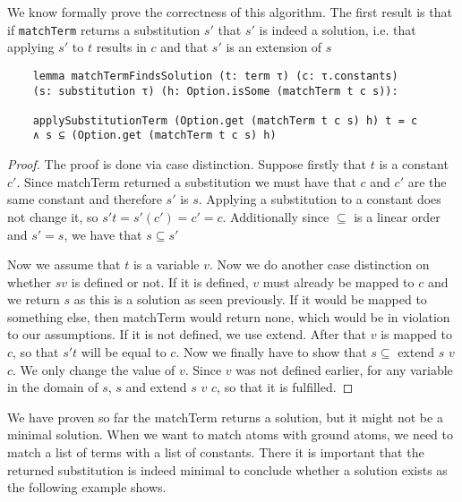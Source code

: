 We know formally prove the correctness of this algorithm. The first result is that if \texttt{matchTerm} returns a substitution $s'$ that $s'$ is indeed a solution, i.e. that applying $s'$ to $t$ results in $c$ and that $s'$ is an extension of $s$

\begin{lstlisting}
    lemma matchTermFindsSolution (t: term τ) (c: τ.constants) 
    (s: substitution τ) (h: Option.isSome (matchTerm t c s)): 

    applySubstitutionTerm (Option.get (matchTerm t c s) h) t = c 
    ∧ s ⊆ (Option.get (matchTerm t c s) h)
\end{lstlisting}
\begin{proof}
The proof is done via case distinction. Suppose firstly that $t$ is a constant $c'$. Since matchTerm returned a substitution we must have that $c$ and $c'$ are the same constant and therefore $s'$ is $s$. Applying a substitution to a constant does not change it, so $s' t = s' (c') = c' = c$. Additionally since $\subseteq$ is a linear order and $s' = s$, we have that $s \subseteq s'$

Now we assume that $t$ is a variable $v$. Now we do another case distinction on whether $s v$ is defined or not. If it is defined, $v$ must already be mapped to $c$ and we return $s$ as this is a solution as seen previously. If it would be mapped to something else, then matchTerm would return none, which would be in violation to our assumptions.
If it is not defined, we use extend. After that $v$ is mapped to $c$, so that $s' t$ will be equal to $c$. Now we finally have to show that $s \subseteq$ extend $s$ $v$ $c$. We only change the value of $v$. Since $v$ was not defined earlier, for any variable in the domain of $s$, $s$ and extend $s$ $v$ $c$, so that it is fulfilled.
\end{proof}

We have proven so far the matchTerm returns a solution, but it might not be a minimal solution. When we want to match atoms with ground atoms, we need to match a list of terms with a list of constants. There it is important that the returned substitution is indeed minimal to conclude whether a solution exists as the following example shows.

